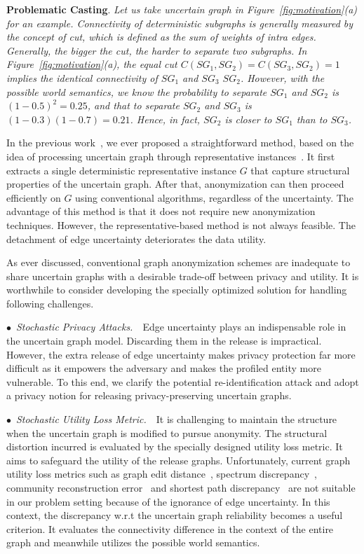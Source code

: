 \textbf{Problematic Casting}.\emph{ Let us take uncertain graph in Figure~\ref{fig:motivation}(a) for an example. Connectivity of deterministic subgraphs is generally measured by the concept of cut, which is defined as the sum of weights of intra edges. Generally, the bigger the cut, the harder to separate two subgraphs. In Figure~\ref{fig:motivation}(a), the equal cut $C(SG_{1},SG_{2})=C(SG_{3},SG_{2})=1$ implies the identical connectivity of $SG_{1}$ and $SG_{3}$ {\wrt} $SG_{2}$. However, with the possible world semantics, we know the probability to separate $SG_{1}$ and $SG_{2}$ is $(1-0.5)^{2}=0.25$, and that to separate $SG_{2}$ and $SG_{3}$ is $(1-0.3)(1-0.7)=0.21$. Hence, in fact, $SG_{2}$ is closer to $SG_{1}$ than to $SG_{3}$. }

In the previous work~\cite{Xiao:2018}, we ever proposed a straightforward method, based on the idea of processing uncertain graph through representative instances~\cite{Parchas_Gullo_Papadias_Bonchi_2014}.
It first extracts a single deterministic representative instance $G$ that capture structural properties of the uncertain graph.
After that, anonymization can then proceed efficiently on $G$ using conventional algorithms, regardless of the uncertainty.  
The advantage of this method is that it does not require new anonymization techniques. 
However, the representative-based method is not always feasible. 
The detachment of edge uncertainty deteriorates the data utility. 

As ever discussed, conventional graph anonymization schemes are inadequate to share uncertain graphs with a desirable trade-off between privacy and utility. 
It is worthwhile to consider developing the specially optimized solution for handling following challenges. 

$\bullet$~\textup{\emph{Stochastic Privacy Attacks.}}~~Edge uncertainty plays an indispensable role in the uncertain graph model. Discarding them in the release is impractical.  
However, the extra release of edge uncertainty makes privacy protection far more difficult as it empowers the adversary and makes the profiled entity more vulnerable. 
To this end, we clarify the potential re-identification attack and adopt a privacy notion for releasing privacy-preserving uncertain graphs.

$\bullet$~\textup{\emph{Stochastic Utility Loss Metric.}}~~It is challenging to maintain the structure when the uncertain graph is modified to pursue anonymity. 
The structural distortion incurred is evaluated by the specially designed utility loss metric.  
It aims to safeguard the utility of the release graphs.  
Unfortunately, current graph utility loss metrics such as graph edit distance~\cite{Liu_Towards_2008}, spectrum discrepancy~\cite{Ying_Randomizing_2008}, community reconstruction error~\cite{Wang2011} and shortest path discrepancy~\cite{Liu_Privacy_2009} 
are not suitable in our problem setting because of the ignorance of edge uncertainty.
In this context, the discrepancy w.r.t the uncertain graph reliability becomes a useful criterion. It evaluates the connectivity difference in the context of the entire graph and meanwhile utilizes the possible world semantics. 

